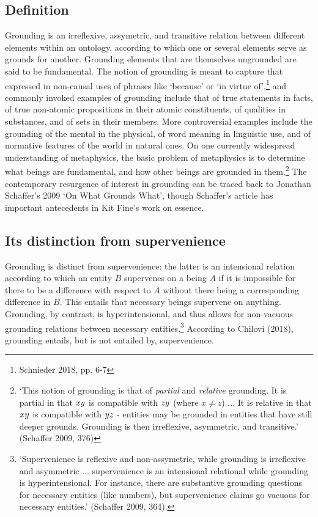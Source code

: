 \documentclass[a4paper,11pt]{article}
\begin{document}
\subsection{Definition}
Grounding is an irreflexive, assymetric, and transitive relation between different elements within an ontology, according to which one or several elements serve as grounds for another. Grounding elements that are themselves ungrounded are said to be fundamental. The notion of grounding is meant to capture that expressed in non-causal uses of phrases like `because' or `in virtue of',\footnote{Schnieder 2018, pp. 6-7} and commonly invoked examples of grounding include that of true statements in facts, of true non-atomic propositions in their atomic constituents, of qualities in substances, and of sets in their members. More controversial examples include the grounding of the mental in the physical, of word meaning in linguistic use, and of normative features of the world in natural ones. On one currently widespread understanding of metaphysics, the basic problem of metaphysics is to determine what beings are fundamental, and how other beings are grounded in them.\footnote{`This notion of grounding is that of \textit{partial} and \textit{relative} grounding. It is partial in that $x\\y$ is compatible with $z\\y$ (where $x \neq z$) ... It is relative in that $x\\y$ is compatible with $y\\z$ - entities may be grounded in entities that have still deeper grounds. Grounding is then irreflexive, asymmetric, and transitive.' (Schaffer 2009, 376)} The contemporary resurgence of interest in grounding can be traced back to Jonathan Schaffer's 2009 `On What Grounds What', though Schaffer's article has important antecedents in Kit Fine's work on essence.

\subsection{Its distinction from supervenience}
Grounding is distinct from supervenience: the latter is an intensional relation according to which an entity $B$ supervenes on a being $A$ if it is impossible for there to be a difference with respect to $A$ without there being a corresponding difference in $B$. This entails that necessary beings supervene on anything. Grounding, by contrast, is hyperintensional, and thus allows for non-vacuous grounding relations between necessary entities.\footnote{`Supervenience is reflexive and non-assymetric, while grounding is irreflexive and asymmetric ... supervenience is an intensional relational while grounding is hyperintensional. For instance, there are substantive grounding questions for necessary entities (like numbers), but supervenience claims go vacuous for necessary entities.' (Schaffer 2009, 364).} According to Chilovi (2018), grounding entails, but is not entailed by, supervenience.
\end{document}
